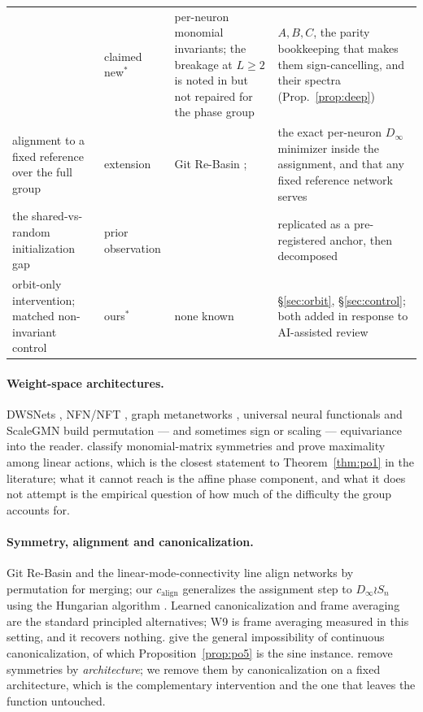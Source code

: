 \documentclass[10pt,twocolumn,letterpaper]{article}
\theoremstyle{definition}
\newcommand{\Dinf}{D_\infty}
\newcommand{\calign}{c_{\mathrm{align}}}
\begin{document}
\begin{table}[t]
{\begin{tabular}{@{}L{2.1cm}L{1.3cm}L{2.2cm}L{2.6cm}@{}}
 & claimed new$^\ast$
 & per-neuron monomial invariants; the breakage at $L\ge2$ is noted in
   \citet{tran2024monomial} but not repaired for the phase group
 & $A,B,C$, the parity bookkeeping that makes them sign-cancelling, and their spectra
   (Prop.~\ref{prop:deep}) \\
\addlinespace[2pt]
alignment to a fixed reference over the full group
 & extension
 & Git Re-Basin \citep{ainsworth2023rebasin}; \citet{entezari2022lmc}
 & the exact per-neuron $\Dinf$ minimizer inside the assignment, and that any fixed reference
   network serves \\
\addlinespace[2pt]
the shared-vs-random initialization gap
 & prior observation
 & \citet{deluigi2023inr2vec,papa2024howtotrain}
 & replicated as a pre-registered anchor, then decomposed \\
\addlinespace[2pt]
orbit-only intervention; matched non-invariant control
 & ours$^\ast$
 & none known
  & \S\ref{sec:orbit}, \S\ref{sec:control}; both added in response to AI-assisted review \\
\bottomrule
\end{tabular}
}
\end{table}

\paragraph{Weight-space architectures.} DWSNets \citep{navon2023dws}, NFN/NFT
\citep{zhou2023nfn,zhou2023nft}, graph metanetworks \citep{lim2024gmn,kofinas2024graph},
universal neural functionals \citep{zhou2024unf} and ScaleGMN \citep{kalogeropoulos2024scalegmn}
build permutation --- and sometimes sign or scaling --- equivariance into the reader.
\citet{tran2024monomial} classify monomial-matrix symmetries and prove maximality among linear
actions, which is the closest statement to Theorem~\ref{thm:po1} in the literature; what it cannot
reach is the affine phase component, and what it does not attempt is the empirical question of how
much of the difficulty the group accounts for.

\paragraph{Symmetry, alignment and canonicalization.} Git Re-Basin \citep{ainsworth2023rebasin}
and the linear-mode-connectivity line \citep{entezari2022lmc} align networks by permutation for
merging; our $\calign$ generalizes the assignment step to $\Dinf \wr S_n$ using the Hungarian
algorithm \citep{kuhn1955hungarian}. Learned canonicalization \citep{kaba2023canonicalization} and
frame averaging \citep{puny2022frame} are the standard principled alternatives; W9 is frame
averaging measured in this setting, and it recovers nothing. \citet{dym2024impossibility} give the
general impossibility of continuous canonicalization, of which Proposition~\ref{prop:po5} is the
sine instance. \citet{lim2024empirical} remove symmetries by \emph{architecture}; we remove them
by canonicalization on a fixed architecture, which is the complementary intervention and the one
that leaves the function untouched.
\end{document}
